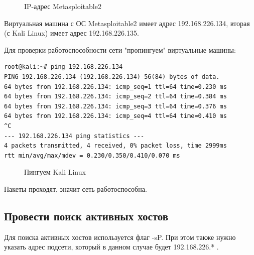 \documentclass[10pt,a4paper,titlepage]{article}
\begin{document}
\begin{figure}[h]	
\caption{IP-адрес Metasploitable2}
\label{ris:image1}
\end{figure}

Виртуальная машина с ОС Metasploitable2 имеет адрес 192.168.226.134, вторая (с Kali Linux) имеет адрес 192.168.226.135.

Для проверки работоспособности сети "пропингуем" виртуальные машины:

\begin{verbatim}
root@kali:~# ping 192.168.226.134
PING 192.168.226.134 (192.168.226.134) 56(84) bytes of data.
64 bytes from 192.168.226.134: icmp_seq=1 ttl=64 time=0.230 ms
64 bytes from 192.168.226.134: icmp_seq=2 ttl=64 time=0.384 ms
64 bytes from 192.168.226.134: icmp_seq=3 ttl=64 time=0.376 ms
64 bytes from 192.168.226.134: icmp_seq=4 ttl=64 time=0.410 ms
^C
--- 192.168.226.134 ping statistics ---
4 packets transmitted, 4 received, 0% packet loss, time 2999ms
rtt min/avg/max/mdev = 0.230/0.350/0.410/0.070 ms
\end{verbatim}

\begin{figure}[h]	
\caption{Пингуем Kali Linux}
\label{ris:image2}
\end{figure}

Пакеты проходят, значит сеть работоспособна.

\subsection{Провести поиск активных хостов}
Для поиска активных хостов используется флаг -sP. При этом также нужно указать адрес подсети, который в данном случае будет 192.168.226.* .
\end{document}
